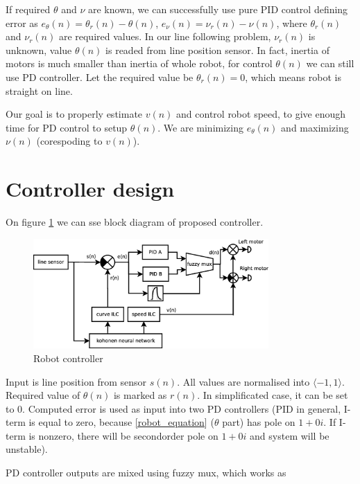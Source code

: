 \documentclass[twoside]{oss-conf-eng}
\begin{document}
If required $\theta$ and $\nu$ are known, we can successfully use pure PID control defining error
as $e_{\theta}(n) = \theta_r(n) - \theta(n)$, $e_{\nu}(n) = \nu_r(n) - \nu(n)$, where $\theta_r(n)$
and $\nu_r(n)$ are required values.
In our line following problem, $\nu_r(n)$ is unknown, value $\theta(n)$ is readed from
line position sensor. In fact, inertia of motors is much
smaller than inertia of whole robot, for control $\theta(n)$ we can still use PD
controller. Let the required value be $\theta_r(n) = 0$, which means robot is straight on line.

Our goal is to properly estimate $v(n)$ and control robot speed, to give enough time
for PD control to setup $\theta(n)$. We are minimizing $e_{\theta}(n)$ and maximizing $\nu(n)$
(corespoding to $v(n)$).


\section{Controller design}

On figure \ref{fig:robot_controller} we can sse block diagram of proposed controller.

\begin{figure}[]
    \centering
    \includegraphics[width=0.8\textwidth]{block_diagram/robot_block.eps}
    \caption{Robot controller}
    \label{fig:robot_controller}
\end{figure}

Input is line position from sensor $s(n)$. All values are normalised into
$\langle -1, 1 \rangle$.
Required value of $\theta(n)$ is marked as
$r(n)$. In simplificated case, it can be set to 0. Computed error is used as input into two
PD controllers (PID in general, I-term is equal to zero, because \ref{robot_equation}
($\theta$ part) has pole on $1 + 0i$. If I-term is nonzero, there will be secondorder pole on $1 + 0i$ and
system will be unstable).

PD controller outputs are mixed using fuzzy mux, which works as
\end{document}
